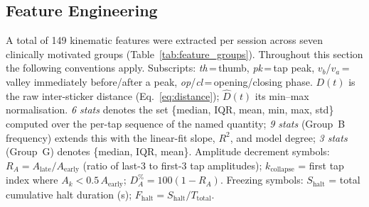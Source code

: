 \documentclass[conference]{IEEEtran}
\begin{document}
\subsection{Feature Engineering}

A total of 149 kinematic features were extracted per session across seven
clinically motivated groups (Table~\ref{tab:feature_groups}).
Throughout this section the following conventions apply.
Subscripts: \emph{th}\,=\,thumb, \emph{pk}\,=\,tap peak,
$v_b$/$v_a$\,=\,valley immediately before/after a peak,
\emph{op}/\emph{cl}\,=\,opening/closing phase.
$D(t)$ is the raw inter-sticker distance (Eq.~\ref{eq:distance});
$\hat{D}(t)$ its min--max normalisation.
\emph{6 stats} denotes the set \{median, IQR, mean, min, max, std\} computed
over the per-tap sequence of the named quantity;
\emph{9 stats} (Group~B frequency) extends this with the linear-fit slope,
$R^2$, and model degree;
\emph{3 stats} (Group~G) denotes \{median, IQR, mean\}.
Amplitude decrement symbols: $R_A = A_\mathrm{late}/A_\mathrm{early}$
(ratio of last-3 to first-3 tap amplitudes);
$k_\mathrm{collapse}$ = first tap index where $A_k < 0.5\,A_\mathrm{early}$;
$D_A^{\%} = 100(1 - R_A)$.
Freezing symbols: $S_\mathrm{halt}$ = total cumulative halt duration (s);
$F_\mathrm{halt} = S_\mathrm{halt}/T_\mathrm{total}$.
\end{document}
